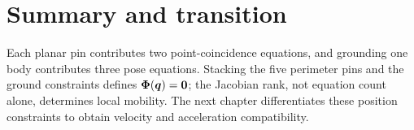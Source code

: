 \documentclass[../main.tex]{subfiles}
\begin{document}
\section{Summary and transition}

Each planar pin contributes two point-coincidence equations, and grounding one body contributes three pose equations. Stacking the five perimeter pins and the ground constraints defines $\boldsymbol{\Phi}(\boldsymbol{q})=\boldsymbol{0}$; the Jacobian rank, not equation count alone, determines local mobility. The next chapter differentiates these position constraints to obtain velocity and acceleration compatibility.

\ifSubfilesClassLoaded{\backmatter\bookbibliography}{}
\end{document}
